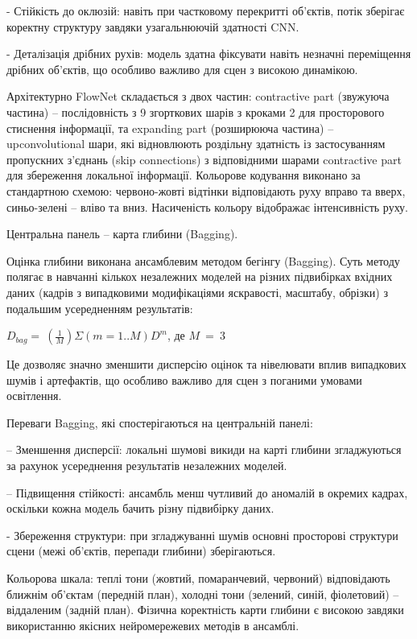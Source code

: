 \documentclass[
]{article}
\begin{document}
- Стійкість до оклюзій: навіть при частковому перекритті об'єктів, потік зберігає коректну структуру завдяки узагальнюючій здатності CNN.

- Деталізація дрібних рухів: модель здатна фіксувати навіть незначні переміщення дрібних об'єктів, що особливо важливо для сцен з високою динамікою.

Архітектурно FlowNet складається з двох частин: contractive part (звужуюча частина) -- послідовність з 9 згорткових шарів з кроками 2 для просторового стиснення інформації, та expanding part (розширююча частина) -- upconvolutional шари, які відновлюють роздільну здатність із застосуванням пропускних з'єднань (skip connections) з відповідними шарами contractive part для збереження локальної інформації. Кольорове кодування виконано за стандартною схемою: червоно-жовті відтінки відповідають руху вправо та вверх, синьо-зелені -- вліво та вниз. Насиченість кольору відображає інтенсивність руху.

Центральна панель -- карта глибини (Bagging).

Оцінка глибини виконана ансамблевим методом бегінгу (Bagging). Суть методу полягає в навчанні кількох незалежних моделей на різних підвибірках вхідних даних (кадрів з випадковими модифікаціями яскравості, масштабу, обрізки) з подальшим усередненням результатів:

\(D_{bag} = \ \left( \frac{1}{M} \right)\Sigma(m = 1..M)D^{m}\), де \(M\  = \ 3\)

Це дозволяє значно зменшити дисперсію оцінок та нівелювати вплив випадкових шумів і артефактів, що особливо важливо для сцен з поганими умовами освітлення.

Переваги Bagging, які спостерігаються на центральній панелі:

-- Зменшення дисперсії: локальні шумові викиди на карті глибини згладжуються за рахунок усереднення результатів незалежних моделей.

-- Підвищення стійкості: ансамбль менш чутливий до аномалій в окремих кадрах, оскільки кожна модель бачить різну підвибірку даних.

- Збереження структури: при згладжуванні шумів основні просторові структури сцени (межі об'єктів, перепади глибини) зберігаються.

Кольорова шкала: теплі тони (жовтий, помаранчевий, червоний) відповідають ближнім об'єктам (передній план), холодні тони (зелений, синій, фіолетовий) -- віддаленим (задній план). Фізична коректність карти глибини є високою завдяки використанню якісних нейромережевих методів в ансамблі.
\end{document}
